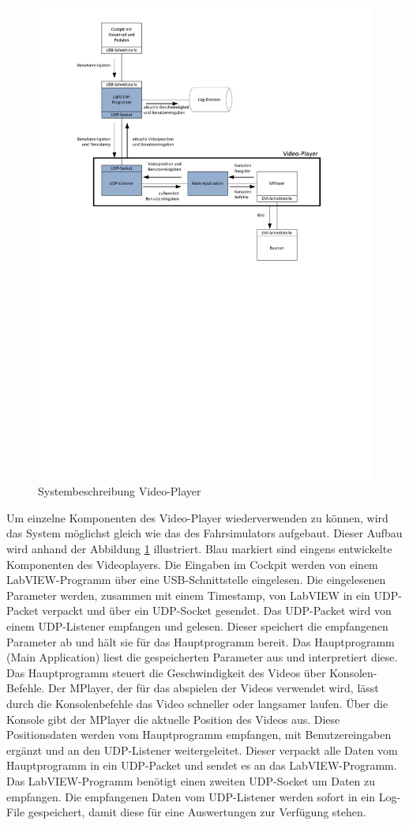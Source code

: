 \begin{figure}[h]
\centering 
\includegraphics[width=0.8\linewidth]{src/Systembeschreibung_VideoPlayer.pdf}
\caption{Systembeschreibung Video-Player} %
\label{Systembeschreibung Video-Player} %
\end{figure}
Um einzelne Komponenten des Video-Player wiederverwenden zu können, wird das System möglichst gleich wie das des Fahrsimulators aufgebaut. Dieser Aufbau wird anhand der Abbildung \ref{Systembeschreibung Video-Player} illustriert. Blau markiert sind eingens entwickelte Komponenten des Videoplayers. Die Eingaben im Cockpit werden von einem LabVIEW-Programm über eine USB-Schnittstelle eingelesen. Die eingelesenen Parameter werden, zusammen mit einem Timestamp, von LabVIEW in ein UDP-Packet verpackt und über ein UDP-Socket gesendet. Das UDP-Packet wird von einem UDP-Listener empfangen und gelesen. Dieser speichert die empfangenen Parameter ab und hält sie für das Hauptprogramm bereit. Das Hauptprogramm (Main Application) liest die gespeicherten Parameter aus und interpretiert diese. Das Hauptprogramm steuert die Geschwindigkeit des Videos über Konsolen-Befehle. Der MPlayer, der für das abspielen der Videos verwendet wird, lässt durch die Konsolenbefehle das Video schneller oder langsamer laufen. Über die Konsole gibt der MPlayer die aktuelle Position des Videos aus. Diese Positionsdaten werden vom Hauptprogramm empfangen, mit Benutzereingaben ergänzt und an den UDP-Listener weitergeleitet. Dieser verpackt alle Daten vom Hauptprogramm in ein UDP-Packet und sendet es an das LabVIEW-Programm. Das LabVIEW-Programm benötigt einen zweiten UDP-Socket um Daten zu empfangen. Die empfangenen Daten vom UDP-Listener werden sofort in ein Log-File gespeichert, damit diese für eine Auswertungen zur Verfügung stehen. 

